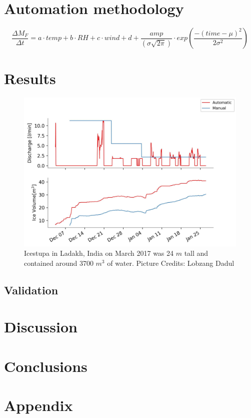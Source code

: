 \documentclass[utf8]{frontiersSCNS}
\begin{document}
\section{Automation methodology}

\begin{equation}
	\frac{\Delta M_{F}}{\Delta t} = a \cdot temp + b \cdot RH + c \cdot wind + d
  +\frac{amp}{(\sigma \sqrt{2\pi})} \cdot exp\left(\frac{-(time-\mu)^2}{2\sigma^2}\right)
\end{equation}

\section{Results}

\begin{figure}
	\begin{center}
		\includegraphics[width=\linewidth]{Figures/autovsmanual.jpg}
	\end{center}
	\caption{Icestupa in Ladakh, India on March 2017 was 24 $m$ tall and contained around 3700 $m^3$
		of water. Picture Credits: Lobzang Dadul}
	\label{fig:old_icestupa}
\end{figure}

\subsection{Validation}

\section{Discussion}

\section{Conclusions}

\section{Appendix}
\end{document}
